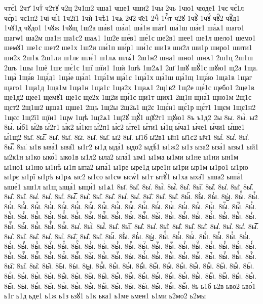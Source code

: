 {чтє́1
2чт҃
1чтⷭ
ч2тꙋ
ч2ц
2ч1ш2
чша1
чше1
чши2
1чы
2чь
1чю1
чюде1
1чє
чє́1л
чє́р1
чє1н2
1чі
чі́1
1ч2ї1
1чѝ
1чѣ1
1чѧ
2ч҃2
ч҃е1
2чⷣ
1чⷭ҇т
ч2ꙋ
1чꙋ̀
1чꙋ́
чꙋ̑2
чꙋ̑д1
1чꙋ1д
чꙋдо1
1чꙋж
1чꙋщ
1ш2а
ша́в1
ша́л1
ша́1н
ша́т1
ша́1ш
ша́є1
ша́ѧ1
шаго1
шагѡ1
ша2м
ша1н
ша1с2
шаѧ1
1ш2е
ше́в1
ше́1с
ше2в1
шее1
ше1л
шело1
шемо1
шемꙋ1
ше1с
шет2
ше1х
1ш2и
ши́1п
ши́р1
ши́1с
ши1в
ши2л
ши1р
широ1
шити1
ши2х
2ш1к
2ш1ли
ш1лє
шлє́1
ш1лѧ
шлѧ́1
2ш1н2
шна1
шно1
шнѧ1
2ш1ц
2ш1ш
2шъ
1шы
1шѐ
1шє
шє́1с
1шї
шїи1
1шѝ
1шѣ
1ш2ѧ1
2ш҃
1шꙋ
шꙋ́1с
шꙋю1
щ2а
1ща.
1ща̀
1ща́в
1ща́д1
1ща́е
ща́л1
1ща́1м
ща́1с
1ща́1х
ща́1ш
ща́1щ
1ща́ю
1ща1в
1щаг
щаго1
1ща1д
1ща1м
1ща1н
1ща1с
1ща2х
1щаѧ1
2щ1в2
1щ2е
ще́1с
щебо1
2ще1в
ще1д2
щее1
щемꙋ1
ще1с
ще2х
1щ2и
щи́1с
щи1т
щих1
2щ1н
щна́1
щно1м
2щ1с
щст2
2щ1ш2
щша1
щше1
2щъ
1щ2ы
2щ2ь1
щ2є
1щє́н1
щє́1р
щє́т1
1щєм
1щє1н2
1щєс
1щ2ї1
щїи1
1щѡ
1щѣ
1щ2ѧ1
1щ2ꙋ
щꙋ́1
щꙋ2т1
щꙋю1
8ъ
ъ1д2
2ы
8ы.
8ы̀.
ы2́
8ы́.
ы́б1
ы́2в
ы́2г1
ы́к2
ы́1кн
ы́2п1
ы́с2
ы́те1
ы́ти1
ы́1ц
ы́ча1
ы́че1
ы́чи1
ы́ше1
ы́1щ2
8ы̂.
8ы̅.
8ы̆.
8ы̇.
8ӹ.
8ы̋.
8ы̏.
ы2̑
8ы̑.
ы̑1б
ы̑2в1
ы̑н1
ы̑1с2
ы̑ч1
8ы̓.
8ы̔.
8ы̾.
8ы̿.
8ы͘.
ы1в
ыва́1
ыва̑1
ы1г2
ы1д
ыда́1
ыдо2
ыдѣ́1
ы1ж2
ы1з
ыза2
ыза́1
ызы1
ый1
ы2к1н
ы1ко
ыко́1
ыко1в
ы1л2
ыла2
ыла́1
ым1
ы1ма
ы1ми
ы1не
ы1ни
ын1м
ы1но1
ы1ню
ы1нѣ
ы1п
ыпа2
ыпа́1
ы1ре
ыре1д
ыре1н
ы1ри
ыр1м
ы1ро1
ы1рю
ы1рє
ы1рї
ы1рѣ
ы1рѧ
ыс2
ы1со
ы1сѡ
ысѡ́1
ы1т
ытꙋ́1
ы1ха
ыха̑1
ыша2
ыша́1
ыше́1
ыш1л
ы1щ
ыща́1
ыщи́1
ы1ѧ1
8ы҃.
8ы҄.
8ы҅.
8ы҅̀.
8ы҅́.
8ы҅̂.
8ы҅̅.
8ы҅̆.
8ы҅̇.
8ы҅̈.
8ы҅̋.
8ы҅̏.
8ы҅̑.
8ы҅̓.
8ы҅̔.
8ы҅̾.
8ы҅̿.
8ы҅͘.
8ы҅҃.
8ы҅҄.
8ы҅҅.
8ы҅҆.
8ы҅҇.
8ы҅᷀.
8ы҅᷁.
8ы҅᷶.
8ы᷷҅.
8ы᷸҅.
8ы᷹҅.
8ы҅ⷠ.
8ы҅ⷡ.
8ы҅ⷢ.
8ы҅ⷣ.
8ы҅ⷤ.
8ы҅ⷥ.
8ы҅ⷦ.
8ы҅ⷧ.
8ы҅ⷨ.
8ы҅ⷩ.
8ы҅ⷪ.
8ы҅ⷫ.
8ы҅ⷬ.
8ы҅ⷭ.
8ы҅ⷮ.
8ы҅ⷯ.
8ы҅ⷰ.
8ы҅ⷱ.
8ы҅ⷲ.
8ы҅ⷳ.
8ы҅ⷴ.
8ы҅ⷵ.
8ы҅ⷶ.
8ы҅ⷷ.
8ы҅ⷸ.
8ы҅ⷹ.
8ы҅ⷺ.
8ы҅ⷻ.
8ы҅ⷼ.
8ы҅ⷽ.
8ы҅ⷾ.
8ы҅ⷿ.
8ы҅꙯.
8ы҅ꙴ.
8ы҅ꙵ.
8ы҅ꙶ.
8ы҅ꙷ.
8ы҅ꙸ.
8ы҅ꙹ.
8ы҅ꙺ.
8ы҅ꙻ.
8ы҅꙼.
8ы҅꙽.
8ы҅ꚞ.
8ы҅ꚟ.
8ы҆.
8ы҆̀.
8ы҆́.
8ы҆̂.
8ы҆̅.
8ы҆̆.
8ы҆̇.
8ы҆̈.
8ы҆̋.
8ы҆̏.
8ы҆̑.
8ы҆̓.
8ы҆̔.
8ы҆̾.
8ы҆̿.
8ы҆͘.
8ы҆҃.
8ы҆҄.
8ы҆҅.
8ы҆҆.
8ы҆҇.
8ы҆᷀.
8ы҆᷁.
8ы҆᷶.
8ы᷷҆.
8ы᷸҆.
8ы᷹҆.
8ы҆ⷠ.
8ы҆ⷡ.
8ы҆ⷢ.
8ы҆ⷣ.
8ы҆ⷤ.
8ы҆ⷥ.
8ы҆ⷦ.
8ы҆ⷧ.
8ы҆ⷨ.
8ы҆ⷩ.
8ы҆ⷪ.
8ы҆ⷫ.
8ы҆ⷬ.
8ы҆ⷭ.
8ы҆ⷮ.
8ы҆ⷯ.
8ы҆ⷰ.
8ы҆ⷱ.
8ы҆ⷲ.
8ы҆ⷳ.
8ы҆ⷴ.
8ы҆ⷵ.
8ы҆ⷶ.
8ы҆ⷷ.
8ы҆ⷸ.
8ы҆ⷹ.
8ы҆ⷺ.
8ы҆ⷻ.
8ы҆ⷼ.
8ы҆ⷽ.
8ы҆ⷾ.
8ы҆ⷿ.
8ы҆꙯.
8ы҆ꙴ.
8ы҆ꙵ.
8ы҆ꙶ.
8ы҆ꙷ.
8ы҆ꙸ.
8ы҆ꙹ.
8ы҆ꙺ.
8ы҆ꙻ.
8ы҆꙼.
8ы҆꙽.
8ы҆ꚞ.
8ы҆ꚟ.
8ы҇.
8ы᷀.
8ы᷁.
8ы᷶.
8ы᷷.
8ы᷸.
8ы᷹.
8ыⷠ.
8ыⷡ.
8ыⷢ.
8ыⷣ.
8ыⷤ.
8ыⷥ.
8ыⷦ.
8ыⷧ.
8ыⷨ.
8ыⷩ.
8ыⷪ.
8ыⷫ.
8ыⷬ.
8ыⷭ.
8ыⷮ.
8ыⷯ.
8ыⷰ.
8ыⷱ.
8ыⷲ.
8ыⷳ.
8ыⷴ.
8ыⷵ.
8ыⷶ.
8ыⷷ.
8ыⷸ.
8ыⷹ.
8ыⷺ.
8ыⷻ.
8ыⷼ.
8ыⷽ.
8ыⷾ.
8ыⷿ.
8ы꙯.
8ыꙴ.
8ыꙵ.
8ыꙶ.
8ыꙷ.
8ыꙸ.
8ыꙹ.
8ыꙺ.
8ыꙻ.
8ы꙼.
8ы꙽.
8ыꚞ.
8ыꚟ.
8ь
ь1б
ь2в
ьво2
ьво́1
ь1г
ь1д
ьде1
ь1ж
ь1з
ьзꙋ1
ь1к
ька1
ь1ме
ьмен1
ь1ми
ь2мо2
ь2мы
}
